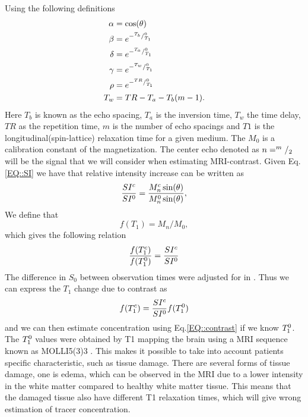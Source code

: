 \documentclass[11pt,a4paper]{article}
\begin{document}
Using the following definitions
\begin{equation}
\begin{aligned}
\alpha &= \cos ( \theta ) \\
\beta  &= e\sp{- \sp{T_b}/_{T_1}\sp{0} } \\
\delta &= e\sp{- \sp{T_a}/_{T_1}\sp{0} } \\
\gamma &= e\sp{- \sp{T_w}/_{T_1}\sp{0} } \\
\rho   &= e\sp{- \sp{TR}/_{T_1}\sp{0} }  \\
T_w    &= TR - T_a -T_b(m-1)       .\\
\end{aligned}
\end{equation}
Here $T_b$ is known as the echo spacing, $T_a$ is the inversion time, $T_w$ the time delay, $TR$ as the repetition time, $m$ is the number of echo spacings and $T1$ is the longitudinal(spin-lattice) relaxation time for a given medium. The $M_0$ is a calibration constant of the magnetization. The center echo denoted as $n=\sp{m}/_2$ will be the signal that we will consider when estimating MRI-contrast. Given Eq.\ref{EQ::SI} we have that relative intensity increase can be written as 
\begin{equation}
\frac{SI\sp{c}}{SI\sp{0}} = \frac{ M_{n}\sp{c} \sin (\theta)}{ M_{n}\sp{0} \sin (\theta) } ,
\end{equation}
We define that  
\begin{equation}
f(T_1) = M_{n}/M_{0} ,
\label{Eq::F}
\end{equation}
which gives the following relation 
\begin{equation}
\frac{f(T_{1}\sp{c} ) }{f(T_{1}\sp{0})}  = \frac{SI\sp{c}}{SI\sp{0}} 
\end{equation}
The difference in $S_0$ between observation times were adjusted for in \cite{ringstad2018brain}.  
Thus we can express the $T_1$ change due to contrast as 
\begin{equation}
f ( T_{1}\sp{c} ) = \frac{SI\sp{c}}{SI\sp{0}} f(T_{1}\sp{0}) 
\end{equation}
and we can then estimate concentration using Eq.\ref{EQ::contrast} if we know $T_{1}\sp{0}$. The $T_{1}\sp{0}$ values were obtained by T1 mapping the brain using a MRI sequence known as MOLLI5(3)3 \cite{TAYLOR201667}. This makes it possible to  take into account patients specific characteristic, such as tissue damage. There are several forms of tissue damage, one is edema, which can be observed in the MRI due to a lower intensity in the white matter compared to healthy white matter tissue. This means that the damaged tissue also have different T1 relaxation times, which will give wrong estimation of tracer concentration. 
\end{document}
